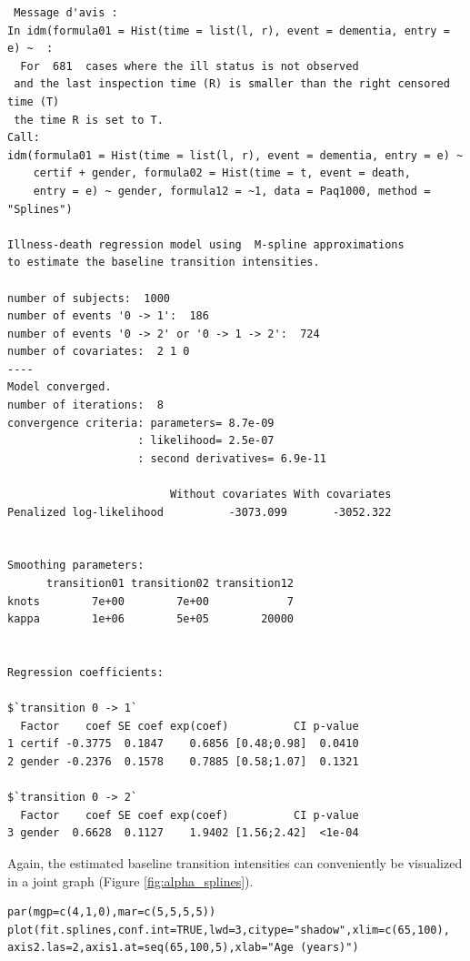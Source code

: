 \documentclass[article]{jss}
\begin{document}
\begin{verbatim}
 Message d'avis :
In idm(formula01 = Hist(time = list(l, r), event = dementia, entry = e) ~  :
  For  681  cases where the ill status is not observed
 and the last inspection time (R) is smaller than the right censored time (T)
 the time R is set to T.
Call:
idm(formula01 = Hist(time = list(l, r), event = dementia, entry = e) ~ 
    certif + gender, formula02 = Hist(time = t, event = death, 
    entry = e) ~ gender, formula12 = ~1, data = Paq1000, method = "Splines")

Illness-death regression model using  M-spline approximations 
to estimate the baseline transition intensities.

number of subjects:  1000 
number of events '0 -> 1':  186 
number of events '0 -> 2' or '0 -> 1 -> 2':  724 
number of covariates:  2 1 0 
----
Model converged.
number of iterations:  8 
convergence criteria: parameters= 8.7e-09 
                    : likelihood= 2.5e-07 
                    : second derivatives= 6.9e-11 

                         Without covariates With covariates
Penalized log-likelihood          -3073.099       -3052.322


Smoothing parameters:
      transition01 transition02 transition12
knots        7e+00        7e+00            7
kappa        1e+06        5e+05        20000


Regression coefficients:

$`transition 0 -> 1`
  Factor    coef SE coef exp(coef)          CI p-value
1 certif -0.3775  0.1847    0.6856 [0.48;0.98]  0.0410
2 gender -0.2376  0.1578    0.7885 [0.58;1.07]  0.1321

$`transition 0 -> 2`
  Factor    coef SE coef exp(coef)          CI p-value
3 gender  0.6628  0.1127    1.9402 [1.56;2.42]  <1e-04
\end{verbatim}

Again, the estimated baseline transition intensities can conveniently
be visualized in a joint graph (Figure \ref{fig:alpha_splines}).

\lstset{language=R,label= ,caption= ,numbers=none}
\begin{lstlisting}
par(mgp=c(4,1,0),mar=c(5,5,5,5))
plot(fit.splines,conf.int=TRUE,lwd=3,citype="shadow",xlim=c(65,100), axis2.las=2,axis1.at=seq(65,100,5),xlab="Age (years)")
\end{lstlisting}
\end{document}
